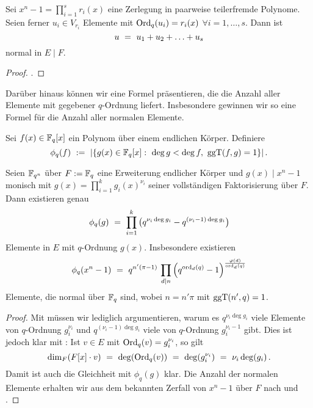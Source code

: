 \begin{kor}
  \label{kor:summe_erzeuger_normal}
  Sei $x^n-1 = \prod_{i=1}^s r_i(x)$ eine Zerlegung in paarweise teilerfremde
  Polynome. Seien ferner $u_i \in V_{r_i}$ Elemente mit 
  $\operatorname{Ord}_q(u_i) = r_i(x)$ $\forall i=1,\ldots,s$. Dann ist
  \[ u \ =\  u_1 + u_2 + \ldots + u_s\]
  normal in $E \mid F$.
\end{kor}
\begin{proof}
  .
\end{proof}

Darüber hinaus können wir  eine
Formel präsentieren, die die Anzahl aller Elemente mit gegebener $q$-Ordnung
liefert. Insbesondere gewinnen wir so eine Formel für die Anzahl aller
normalen Elemente.

\begin{definition}
  Sei $f(x) \in \mathbb{F}_q[x]$ ein Polynom über einem endlichen Körper. Definiere
  \[ \phi_q(f) \speq{:=} |\{ g(x) \in \F_q[x]:\ 
    \deg g < \deg f,\ \ggT(f,g) = 1\}|\,.\]
\end{definition}

\begin{satz}
  \label{satz:anzahl_normal}
  Seien $\mathbb{F}_{q^n}$ über $F:=\mathbb{F}_q$ eine Erweiterung endlicher
  Körper und $g(x) \mid x^n-1$ monisch mit $g(x) = \prod_{i=1}^k
  g_i(x)^{\nu_i}$ seiner vollständigen Faktorisierung über $F$. Dann 
  existieren genau
  \[\phi_q(g) \ =\  \prod_{i=1}^k \big( q^{\nu_i\deg g_i} - q^{(\nu_i-1)\deg
    g_i}\big)\]
  Elemente in $E$ mit $q$-Ordnung $g(x)$.
  Insbesondere existieren
  \[ \phi_q(x^n-1) \ =\  q^{n'(\pi-1)}\,\prod_{d\mid n}
    \left( q^{\operatorname{ord}_d(q)} -1 \right)^{\frac{\varphi(d)}{\operatorname{ord}_d(q)}}\]
  Elemente, die normal über $\mathbb{F}_q$ sind, wobei $n = n'\pi$ mit $\operatorname{ggT}(n',q) = 1$.
\end{satz}
\begin{proof}
  Mit  müssen wir lediglich argumentieren, warum
  es $q^{\nu_i\deg g_i}$ viele Elemente von $q$-Ordnung $g_i^{\nu_i}$ und
  $q^{(\nu_i-1)\deg g_i}$ viele von $q$-Ordnung $g_i^{\nu_i-1}$ gibt. Dies ist
  jedoch klar mit \thref{lemma:modul_dim_deg}: Ist $v\in E$ mit 
  $\operatorname{Ord}_q(v) = g_i^{\nu_i}$, so gilt
  \[ \dim_F(F[x]\cdot v) \ =\  \deg(\operatorname{Ord}_q(v))\ =\  \deg(g_i^{\nu_i})
    \ =\  \nu_i \deg(g_i)\,.\]
  Damit ist auch die Gleichheit mit $\phi_q(g)$ klar.
  Die Anzahl der normalen Elemente erhalten wir aus dem bekannten
  Zerfall von $x^n-1$ über $F$ nach 
   und .
\end{proof}


